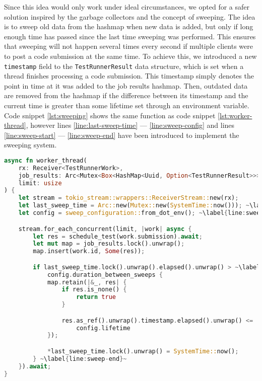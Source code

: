 Since this idea would only work under ideal circumstances, we opted for a safer solution inspired by the garbage collectors and the concept of sweeping.
The idea is to sweep old data from the hashmap when new data is added, but only if long enough time has passed since the last time sweeping was performed.
This ensures that sweeping will not happen several times every second if multiple clients were to post a code submission at the same time.
To achieve this, we introduced a new \texttt{timestamp} field to the \texttt{TestRunnerResult} data structure, which is set when a thread finishes processing a code submission.
This timestamp simply denotes the point in time at it was added to the job results hashmap.
Then, outdated data are removed from the hashmap if the difference between its timestamp and the current time is greater than some lifetime set through an environment variable.
Code snippet \ref{lst:sweeping} shows the same function as code snippet \ref{lst:worker-thread}, however lines \ref{line:last-sweep-time} --- \ref{line:sweep-config} and lines \ref{line:sweep-start} --- \ref{line:sweep-end} have been introduced to implement the sweeping system.


\begin{lstlisting}[language=rust, escapechar=~, caption={The function introduced in section \ref{sec:queue-system} updated with sweeping}, label={lst:sweeping}]
async fn worker_thread(
    rx: Receiver<TestRunnerWork>,
    job_results: Arc<Mutex<Box<HashMap<Uuid, Option<TestRunnerResult>>>>>,
    limit: usize
) {
    let stream = tokio_stream::wrappers::ReceiverStream::new(rx);
    let last_sweep_time = Arc::new(Mutex::new(SystemTime::now())); ~\label{line:last-sweep-time}~
    let config = sweep_configuration::from_dot_env(); ~\label{line:sweep-config}~

    stream.for_each_concurrent(limit, |work| async {
        let res = schedule_test(work.submission).await;
        let mut map = job_results.lock().unwrap();
        map.insert(work.id, Some(res));

        if last_sweep_time.lock().unwrap().elapsed().unwrap() > ~\label{line:sweep-start}~
            config.duration_between_sweeps {
            map.retain(|&_, res| {
                if res.is_none() {
                    return true
                }

                res.as_ref().unwrap().timestamp.elapsed().unwrap() <=
                    config.lifetime
            });

            *last_sweep_time.lock().unwrap() = SystemTime::now();
        } ~\label{line:sweep-end}~
    }).await;
}
\end{lstlisting}

